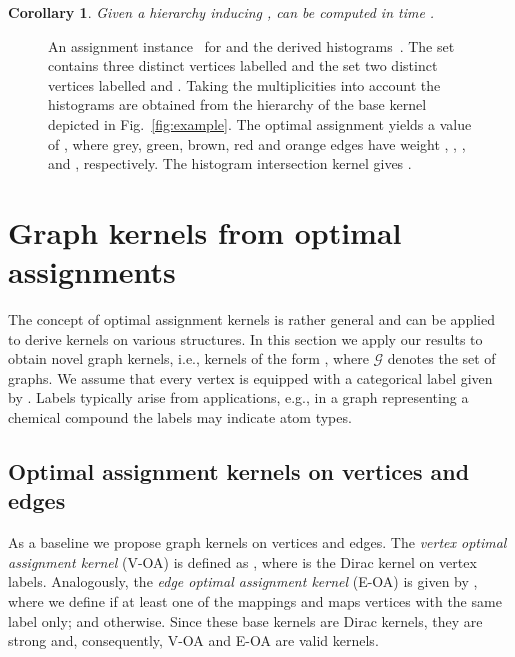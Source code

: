 \documentclass{article}
\newtheorem{corollary}{Corollary}
\newcommand{\G}{\ensuremath{\mathcal{G}}\xspace}
\begin{document}
\begin{corollary}
 Given a hierarchy inducing ,  can be computed in time 
 .
\end{corollary}


\begin{figure}
  \centering
  \null\hfill
  \hfill
  \hfill\null
  \caption{
    An assignment instance~ for 
     and the derived histograms~.
    The set  contains three distinct vertices labelled  and the set  two
    distinct vertices labelled  and . Taking the multiplicities into account 
    the histograms are obtained from the hierarchy of the base kernel  depicted in Fig.~\ref{fig:example}.
    The optimal assignment yields a value of , where grey,
    green, brown, red and orange edges have weight , , ,  and , 
    respectively.
    The histogram intersection kernel gives
    .       
  }
  \label{fig:example:hist}
\end{figure}


\section{Graph kernels from optimal assignments}
The concept of optimal assignment kernels is rather general and can be applied
to derive kernels on various structures.
In this section we apply our results to obtain novel graph kernels, i.e., kernels
of the form , where \G denotes the set of graphs.
We assume that every vertex  is equipped with a categorical label given by . 
Labels typically arise from applications, e.g., in a graph representing a chemical 
compound the labels may indicate atom types.

\subsection{Optimal assignment kernels on vertices and edges} \label{sec:baseline}

As a baseline we propose graph kernels on vertices and edges.
The \emph{vertex optimal assignment kernel} (V-OA) is defined as 
, where  is the Dirac kernel on vertex 
labels.
Analogously, the \emph{edge optimal assignment kernel} (E-OA) is given by
, where we define  if at least
one of the mappings  and 
maps vertices with the same label only; and  otherwise.
Since these base kernels are Dirac kernels, they are strong and, consequently, 
V-OA and E-OA are valid kernels.
\end{document}
